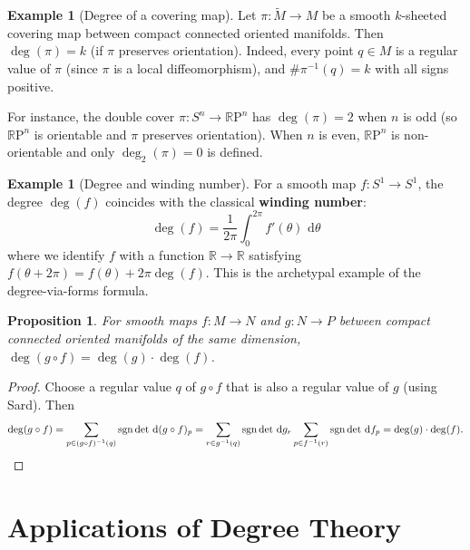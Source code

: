 \documentclass[12pt,a4paper,openany]{book}
\newtheorem{proposition}[theorem]{Proposition}
\theoremstyle{definition}
\newtheorem{example}[theorem]{Example}
\theoremstyle{remark}
\newcommand{\R}{\mathbb{R}}
\newcommand{\RP}{\mathbb{R}\mathrm{P}}
\newcommand{\dd}{\,\mathrm{d}}
\begin{document}
\begin{example}[Degree of a covering map]\label{ex:degree-covering}
Let $\pi\colon \tilde{M}\to M$ be a smooth $k$-sheeted covering map
between compact connected oriented manifolds. Then $\deg(\pi)=k$
(if $\pi$ preserves orientation). Indeed, every point $q\in M$ is a
regular value of $\pi$ (since $\pi$ is a local diffeomorphism),
and $\#\pi^{-1}(q)=k$ with all signs positive.

For instance, the double cover $\pi\colon S^n \to \RP^n$ has
$\deg(\pi) = 2$ when $n$ is odd (so $\RP^n$ is orientable and
$\pi$ preserves orientation). When $n$ is even, $\RP^n$ is
non-orientable and only $\deg_2(\pi) = 0$ is defined.
\end{example}

\begin{example}[Degree and winding number]\label{ex:winding-number}
For a smooth map $f\colon S^1 \to S^1$, the degree $\deg(f)$
coincides with the classical \textbf{winding number}:
\[
  \deg(f) = \frac{1}{2\pi}\int_0^{2\pi} f'(\theta)\,\dd\theta
\]
where we identify $f$ with a function $\R\to\R$ satisfying
$f(\theta+2\pi) = f(\theta) + 2\pi\deg(f)$. This is the archetypal
example of the degree-via-forms formula.
\end{example}

\begin{proposition}\label{prop:degree-composition}
For smooth maps $f\colon M \to N$ and $g\colon N \to P$ between
compact connected oriented manifolds of the same dimension,
$\deg(g \circ f) = \deg(g)\cdot\deg(f)$.
\end{proposition}

\begin{proof}
Choose a regular value $q$ of $g \circ f$ that is also a regular value
of $g$ (using Sard). Then
\[
  \deg(g\circ f) = \sum_{p\in(g\circ f)^{-1}(q)}
  \operatorname{sgn}\det\dd(g\circ f)_p
  = \sum_{r\in g^{-1}(q)}\operatorname{sgn}\det\dd g_r
  \sum_{p\in f^{-1}(r)}\operatorname{sgn}\det\dd f_p
  = \deg(g)\cdot\deg(f). \qedhere
\]
\end{proof}

\section{Applications of Degree Theory}\label{sec:degree-applications}
\end{document}

